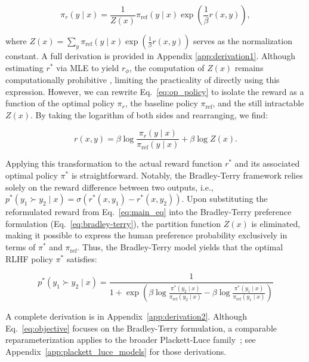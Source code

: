 \begin{equation}\label{eq:op_policy}
    \pi_r(y\mid x) = \frac{1}{Z(x)}\pi_\text{ref}(y\mid x)\exp\left(\frac{1}{\beta}r(x, y)\right),
\end{equation}

where $Z(x) =\sum_{y}\pi_\text{ref}(y\mid x)\exp\left(\frac{1}{\beta}r(x, y)\right)$ serves as the normalization constant. A full derivation is provided in Appendix \ref{app:derivation1}. Although estimating $r^*$ via MLE to yield $r_{\phi}$, the computation of $Z(x)$ remains computationally prohibitive \citep{korbak2022reinforcement, go2023aligning}, limiting the practicality of directly using this expression. However, we can rewrite Eq.~\ref{eq:op_policy} to isolate the reward as a function of the optimal policy $\pi_r$, the baseline policy $\pi_\text{ref}$, and the still intractable $Z(x)$. By taking the logarithm of both sides and rearranging, we find:

\begin{equation}\label{eq:main_eq}
    r(x,y) =\beta \log \frac{\pi_r(y\mid x)}{\pi_\text{ref}(y\mid x)} + \beta \log Z(x).
\end{equation}

Applying this transformation to the actual reward function $r^*$ and its associated optimal policy $\pi^*$ is straightforward. Notably, the Bradley-Terry framework relies solely on the reward difference between two outputs, i.e., ${p^*(y_1 \succ y_2 \mid x) = \sigma(r^*(x, y_1) - r^*(x, y_2))}$. Upon substituting the reformulated reward from Eq.~\ref{eq:main_eq} into the Bradley-Terry preference formulation (Eq.~\ref{eq:bradley-terry}), the partition function $Z(x)$ is eliminated, making it possible to express the human preference probability exclusively in terms of $\pi^*$ and $\pi_\text{ref}$. Thus, the Bradley-Terry model yields that the optimal RLHF policy $\pi^*$ satisfies:

\begin{equation}\label{eq:objective}
    p^*(y_1\succ y_2 \mid x)=\frac{1}{1 + \exp\left(\beta \log \frac{\pi^*(y_2\mid x)}{\pi_\text{ref}(y_2\mid x)} - \beta \log \frac{\pi^*(y_1\mid x)}{\pi_\text{ref}(y_1\mid x)}\right)}
\end{equation}

A complete derivation is in Appendix~\ref{app:derivation2}. Although Eq.~\ref{eq:objective} focuses on the Bradley-Terry formulation, a comparable reparameterization applies to the broader Plackett-Luce family~\citep{plackett1975analysis, luce2012individual}; see Appendix~\ref{app:plackett_luce_models} for those derivations.

